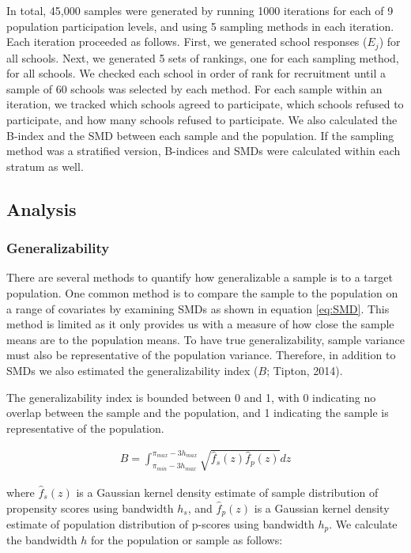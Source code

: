 \documentclass[english,man,floatsintext]{apa6}
\begin{document}
In total, 45,000 samples were generated by running 1000 iterations for each of 9 population participation levels, and using 5 sampling methods in each iteration. Each iteration proceeded as follows. First, we generated school responses (\(E_j\)) for all schools. Next, we generated 5 sets of rankings, one for each sampling method, for all schools. We checked each school in order of rank for recruitment until a sample of 60 schools was selected by each method. For each sample within an iteration, we tracked which schools agreed to participate, which schools refused to participate, and how many schools refused to participate. We also calculated the B-index and the SMD between each sample and the population. If the sampling method was a stratified version, B-indices and SMDs were calculated within each stratum as well.

\hypertarget{analysis}{%
\subsection{Analysis}\label{analysis}}

\hypertarget{generalizability}{%
\subsubsection{Generalizability}\label{generalizability}}

There are several methods to quantify how generalizable a sample is to a target population. One common method is to compare the sample to the population on a range of covariates by examining SMDs as shown in equation \eqref{eq:SMD}. This method is limited as it only provides us with a measure of how close the sample means are to the population means. To have true generalizability, sample variance must also be representative of the population variance. Therefore, in addition to SMDs we also estimated the generalizability index (\(B\); Tipton, 2014).

The generalizability index is bounded between 0 and 1, with 0 indicating no overlap between the sample and the population, and 1 indicating the sample is representative of the population.

\begin{align}
B = \int_{\pi_{min}-3h_{max}}^{\pi_{max}-3h_{max}}\sqrt{\hat{f}_s(z)\hat{f}_p(z)}dz
\end{align}

where \(\hat{f}_s(z)\) is a Gaussian kernel density estimate of sample distribution of propensity scores using bandwidth \(h_s\), and \(\hat{f}_p(z)\) is a Gaussian kernel density estimate of population distribution of p-scores using bandwidth \(h_p\). We calculate the bandwidth \(h\) for the population or sample as follows:
\end{document}
